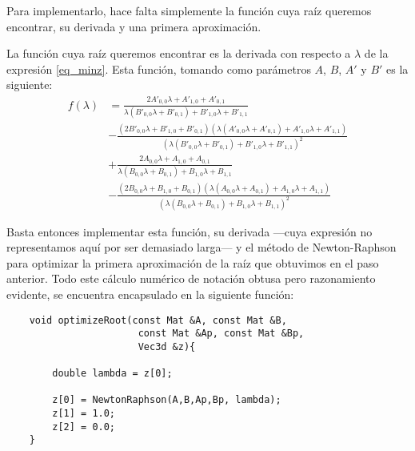 \documentclass[a4paper, 11pt]{article}
\theoremstyle{definition}
\begin{document}
    Para implementarlo, hace falta simplemente la función cuya raíz queremos encontrar, su derivada y una primera aproximación.

    La función cuya raíz queremos encontrar es la derivada con respecto a $\lambda$ de la expresión \ref{eq_minz}. Esta función, tomando como parámetros $A$, $B$, $A'$ y $B'$ es la siguiente:
    \begin{align*}
    f(\lambda) &= \frac{2A'_{0,0}\lambda+A'_{1,0}+A'_{0,1}}{\lambda(B'_{0,0}\lambda+B'_{0,1})+B'_{1,0}\lambda+B'_{1,1}} \\
    &- \frac{(2B'_{0,0}\lambda+B'_{1,0}+B'_{0,1})(\lambda(A'_{0,0}\lambda+A'_{0,1})+A'_{1,0}\lambda+A'_{1,1})}{(\lambda(B'_{0,0}\lambda+B'_{0,1})+B'_{1,0}\lambda+B'_{1,1})^2} \\
    &+ \frac{2A_{0,0}\lambda+A_{1,0}+A_{0,1}}{\lambda(B_{0,0}\lambda+B_{0,1})+B_{1,0}\lambda+B_{1,1}} \\
    & - \frac{(2B_{0,0}\lambda+B_{1,0}+B_{0,1})(\lambda(A_{0,0}\lambda+A_{0,1})+A_{1,0}\lambda+A_{1,1})}{(\lambda(B_{0,0}\lambda+B_{0,1})+B_{1,0}\lambda+B_{1,1})^2}
    \end{align*}

    Basta entonces implementar esta función, su derivada ---cuya expresión no representamos aquí por ser demasiado larga--- y el método de Newton-Raphson para optimizar la primera aproximación de la raíz que obtuvimos en el paso anterior. Todo este cálculo numérico de notación obtusa pero razonamiento evidente, se encuentra encapsulado en la siguiente función:
    \begin{lstlisting}
    void optimizeRoot(const Mat &A, const Mat &B,
                       const Mat &Ap, const Mat &Bp,
                       Vec3d &z){

        double lambda = z[0];

        z[0] = NewtonRaphson(A,B,Ap,Bp, lambda);
        z[1] = 1.0;
        z[2] = 0.0;
    }
    \end{lstlisting}
\end{document}
